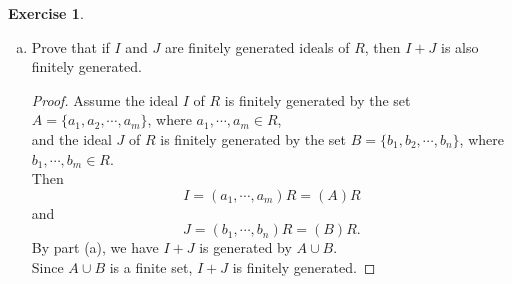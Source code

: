 \documentclass{article}
\theoremstyle{plain}
\theoremstyle{definition}
\newtheorem{exer}[lem]{Exercise}
\begin{document}
\begin{exer}
\begin{enumerate}[(a)]
\begin{proof}
\begin{enumerate}[(1)]
Then
   \begin{align*}
       x &= \sum_{i}^{M} c_ir_i + \sum_{i=M+1}^{N} c_ir_i \\
       &\in (A)R + (B)R\\
       &=I+J.
   \end{align*}
So
\begin{equation}\label{eq2}
(A\cup B)R \subseteq I+J.
\end{equation}
Thus, by \eqref{eq1} and \eqref{eq2}, we have
\[I + J = (A\cup B)R.\]
Therefore, $I+J$ is generated by $A\cup B$.
\end{enumerate}
\end{proof}
\item 
Prove that if $I$ and $J$ are finitely generated ideals of $R$, then $I+J$ is also finitely generated.
\begin{proof}
    Assume the ideal $I$ of $R$ is finitely generated by the set $A = \{a_1,a_2,\cdots,a_m\}$, where $a_1,\cdots,a_m \in R$,\\
    and the ideal $J$ of $R$ is finitely generated by the set $B=\{b_1,b_2,\cdots,b_n\}$, where $b_1,\cdots,b_m \in R$.\\
    Then
    \[I= (a_1,\cdots,a_m)R = (A)R\]
    and 
    \[J = (b_1,\cdots,b_n)R = (B)R.\]
    By part (a), we have $I+J$ is generated by $A\cup B$.\\
    Since $A\cup B$ is a finite set, $I+J$ is finitely generated.
\end{proof}
\end{enumerate}
\end{exer}
\end{document}
